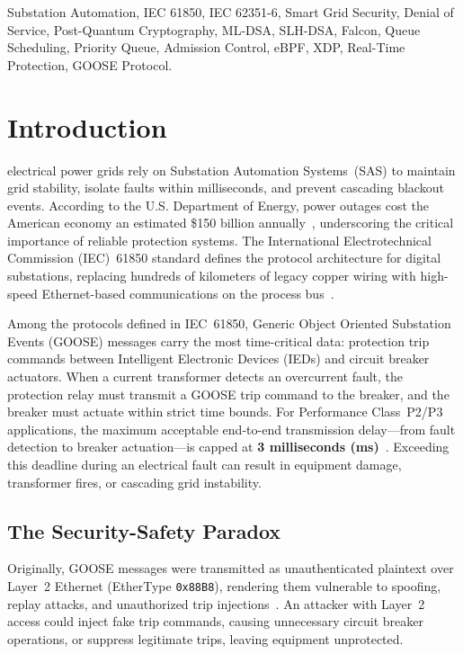 \documentclass{ieeeaccess}
\begin{document}
\begin{keywords}
Substation Automation, IEC 61850, IEC 62351-6, Smart Grid Security, Denial of Service, Post-Quantum Cryptography, ML-DSA, SLH-DSA, Falcon, Queue Scheduling, Priority Queue, Admission Control, eBPF, XDP, Real-Time Protection, GOOSE Protocol.
\end{keywords}

\titlepgskip=-21pt

\section{Introduction}
 electrical power grids rely on Substation Automation Systems~(SAS) to maintain grid stability, isolate faults within milliseconds, and prevent cascading blackout events. According to the U.S. Department of Energy, power outages cost the American economy an estimated \$150 billion annually~\cite{parviz2022dos}, underscoring the critical importance of reliable protection systems. The International Electrotechnical Commission (IEC)~61850 standard defines the protocol architecture for digital substations, replacing hundreds of kilometers of legacy copper wiring with high-speed Ethernet-based communications on the process bus~\cite{iec61850}.

Among the protocols defined in IEC~61850, Generic Object Oriented Substation Events (GOOSE) messages carry the most time-critical data: protection trip commands between Intelligent Electronic Devices (IEDs) and circuit breaker actuators. When a current transformer detects an overcurrent fault, the protection relay must transmit a GOOSE trip command to the breaker, and the breaker must actuate within strict time bounds. For Performance Class~P2/P3 applications, the maximum acceptable end-to-end transmission delay---from fault detection to breaker actuation---is capped at \textbf{3 milliseconds (ms)}~\cite{iec61850}. Exceeding this deadline during an electrical fault can result in equipment damage, transformer fires, or cascading grid instability.

\subsection{The Security-Safety Paradox}
Originally, GOOSE messages were transmitted as unauthenticated plaintext over Layer~2 Ethernet (EtherType \texttt{0x88B8}), rendering them vulnerable to spoofing, replay attacks, and unauthorized trip injections~\cite{schuster2017goose, hong2014cyber}. An attacker with Layer~2 access could inject fake trip commands, causing unnecessary circuit breaker operations, or suppress legitimate trips, leaving equipment unprotected.
\end{document}
